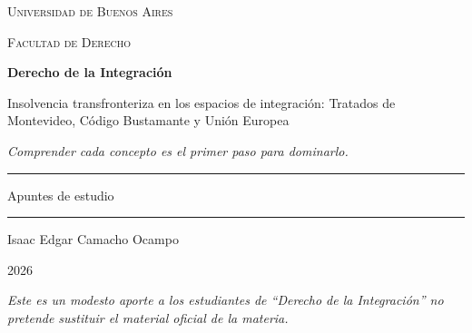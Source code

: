 \documentclass[12pt,oneside]{book}
\newcommand{\universidad}{Universidad de Buenos Aires}
\newcommand{\facultad}{Facultad de Derecho}
\newcommand{\materia}{Derecho de la Integración}
\newcommand{\titulo}{Insolvencia transfronteriza en los espacios de integración: Tratados de Montevideo, Código Bustamante y Unión Europea}
\newcommand{\autor}{Isaac Edgar Camacho Ocampo}
\newcommand{\anio}{2026}
\begin{document}
\begin{titlepage}

\thispagestyle{empty}

\begin{center}

\vspace*{1cm}

{\large \textsc{\universidad}}

\vspace{0.2cm}

{\large \textsc{\facultad}}

\vspace{3cm}

{\Huge \textbf{\materia}}

\vspace{1cm}

{\LARGE \titulo}

\vspace{0.8cm}

\textit{Comprender cada concepto es el primer paso para dominarlo.}

\vspace{1.2cm}

\rule{0.70\textwidth}{0.5pt}

\vspace{0.5cm}

{\large Apuntes de estudio}

\vspace{0.5cm}

\rule{0.70\textwidth}{0.5pt}

\vfill

{\large \autor}

\vspace{0.3cm}

{\large \anio}

\end{center}

\vfill

\begin{flushleft}
\textit{Este es un modesto aporte a los estudiantes de ``\materia'' no pretende sustituir el material oficial de la materia.}
\end{flushleft}

\end{titlepage}

\tableofcontents
\clearpage
\end{document}
